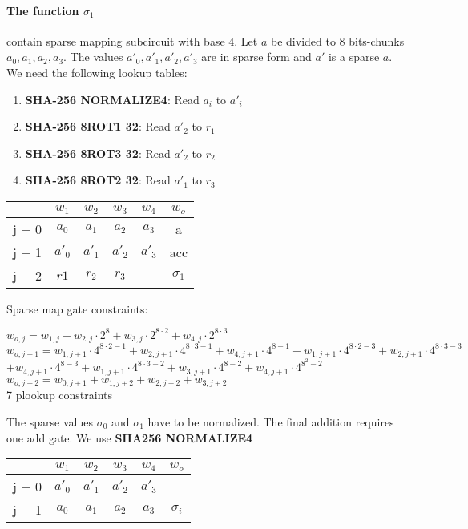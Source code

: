 \paragraph{The function $\sigma_1$} contain sparse mapping subcircuit with base $4$.
Let $a$ be divided to 8 bits-chunks $a_0, a_1, a_2, a_3$.
The values $a'_0, a'_1, a'_2, a'_3$ are in sparse form and $a'$ is a sparse $a$.
We need the following lookup tables:
\begin{enumerate}
    \item \textbf{SHA-256 NORMALIZE4}: Read $a_i$ to $a'_i$
    \item \textbf{SHA-256 8ROT1 32}: Read $a'_2$ to $r_1$
    \item \textbf{SHA-256 8ROT3 32}: Read $a'_2$ to $r_2$
    \item \textbf{SHA-256 8ROT2 32}: Read $a'_1$ to $r_3$
\end{enumerate}
\begin{center}
    \begin{tabular}{ c|c|c|c|c|c }
        & $w_1$  & $w_2$  & $w_3$  & $w_4$  & $w_o$      \\
        \hline
        j + 0 & $a_0$  & $ a_1$ & $a_2$  & $a_3$  & a          \\
        j + 1 & $a'_0$ & $a'_1$ & $a'_2$ & $a'_3$ & acc        \\
        j + 2 & $r1 $  & $r_2$  & $r_3$  &        & $\sigma_1$ \\
    \end{tabular}
\end{center}
Sparse map gate constraints:
\begin{center}
    $w_{o,j} = w_{1,j} + w_{2,j} \cdot 2^8 + w_{3,j} \cdot 2^{8 \cdot 2} + w_{4,j} \cdot 2^{8 \cdot 3}$ \\
    $w_{o,j + 1} = w_{1,j + 1} \cdot 4^{8 \cdot 2 - 1} + w_{2,j + 1} \cdot 4^{8 \cdot 3 - 1} + w_{4,j + 1} \cdot 4^{8 - 1}
    + w_{1,j + 1} \cdot 4^{8 \cdot 2 - 3} + w_{2,j + 1} \cdot 4^{8 \cdot 3 - 3}$\\
    $+ w_{4,j + 1} \cdot 4^{8 - 3}
    + w_{1,j + 1} \cdot 4^{8 \cdot 3 - 2} + w_{3,j + 1} \cdot 4^{8-2} + w_{4,j + 1} \cdot 4^{8^2 - 2}$ \\
    $w_{o, j+2} = w_{0, j+1} + w_{1,j+2} + w_{2, j+2} + w_{3, j+2}$ \\
    7 plookup constraints \\
\end{center}

The sparse values $\sigma_0$ and $\sigma_1$ have to be normalized.
The final addition requires one add gate.
We use \textbf{SHA256 NORMALIZE4}
\begin{center}
    \begin{tabular}{ c|c|c|c|c|c }
        & $w_1$  & $w_2$  & $w_3$  & $w_4$  & $w_o$      \\
        \hline
        j + 0 & $a'_0$ & $a'_1$ & $a'_2$ & $a'_3$ &            \\
        j + 1 & $a_0$  & $ a_1$ & $a_2$  & $a_3$  & $\sigma_i$ \\
    \end{tabular}
\end{center}

